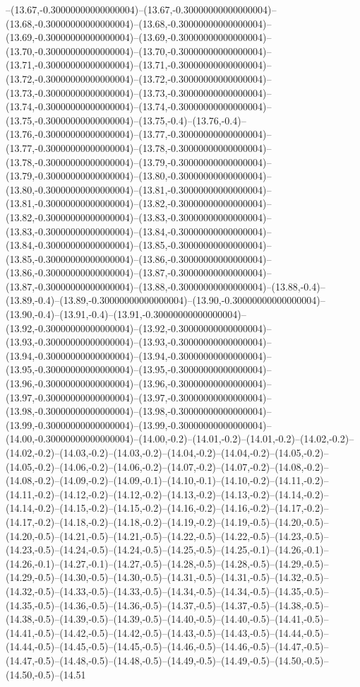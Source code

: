 --(13.67,-0.30000000000000004)--(13.67,-0.30000000000000004)--(13.68,-0.30000000000000004)--(13.68,-0.30000000000000004)--(13.69,-0.30000000000000004)--(13.69,-0.30000000000000004)--(13.70,-0.30000000000000004)--(13.70,-0.30000000000000004)--(13.71,-0.30000000000000004)--(13.71,-0.30000000000000004)--(13.72,-0.30000000000000004)--(13.72,-0.30000000000000004)--(13.73,-0.30000000000000004)--(13.73,-0.30000000000000004)--(13.74,-0.30000000000000004)--(13.74,-0.30000000000000004)--(13.75,-0.30000000000000004)--(13.75,-0.4)--(13.76,-0.4)--(13.76,-0.30000000000000004)--(13.77,-0.30000000000000004)--(13.77,-0.30000000000000004)--(13.78,-0.30000000000000004)--(13.78,-0.30000000000000004)--(13.79,-0.30000000000000004)--(13.79,-0.30000000000000004)--(13.80,-0.30000000000000004)--(13.80,-0.30000000000000004)--(13.81,-0.30000000000000004)--(13.81,-0.30000000000000004)--(13.82,-0.30000000000000004)--(13.82,-0.30000000000000004)--(13.83,-0.30000000000000004)--(13.83,-0.30000000000000004)--(13.84,-0.30000000000000004)--(13.84,-0.30000000000000004)--(13.85,-0.30000000000000004)--(13.85,-0.30000000000000004)--(13.86,-0.30000000000000004)--(13.86,-0.30000000000000004)--(13.87,-0.30000000000000004)--(13.87,-0.30000000000000004)--(13.88,-0.30000000000000004)--(13.88,-0.4)--(13.89,-0.4)--(13.89,-0.30000000000000004)--(13.90,-0.30000000000000004)--(13.90,-0.4)--(13.91,-0.4)--(13.91,-0.30000000000000004)--(13.92,-0.30000000000000004)--(13.92,-0.30000000000000004)--(13.93,-0.30000000000000004)--(13.93,-0.30000000000000004)--(13.94,-0.30000000000000004)--(13.94,-0.30000000000000004)--(13.95,-0.30000000000000004)--(13.95,-0.30000000000000004)--(13.96,-0.30000000000000004)--(13.96,-0.30000000000000004)--(13.97,-0.30000000000000004)--(13.97,-0.30000000000000004)--(13.98,-0.30000000000000004)--(13.98,-0.30000000000000004)--(13.99,-0.30000000000000004)--(13.99,-0.30000000000000004)--(14.00,-0.30000000000000004)--(14.00,-0.2)--(14.01,-0.2)--(14.01,-0.2)--(14.02,-0.2)--(14.02,-0.2)--(14.03,-0.2)--(14.03,-0.2)--(14.04,-0.2)--(14.04,-0.2)--(14.05,-0.2)--(14.05,-0.2)--(14.06,-0.2)--(14.06,-0.2)--(14.07,-0.2)--(14.07,-0.2)--(14.08,-0.2)--(14.08,-0.2)--(14.09,-0.2)--(14.09,-0.1)--(14.10,-0.1)--(14.10,-0.2)--(14.11,-0.2)--(14.11,-0.2)--(14.12,-0.2)--(14.12,-0.2)--(14.13,-0.2)--(14.13,-0.2)--(14.14,-0.2)--(14.14,-0.2)--(14.15,-0.2)--(14.15,-0.2)--(14.16,-0.2)--(14.16,-0.2)--(14.17,-0.2)--(14.17,-0.2)--(14.18,-0.2)--(14.18,-0.2)--(14.19,-0.2)--(14.19,-0.5)--(14.20,-0.5)--(14.20,-0.5)--(14.21,-0.5)--(14.21,-0.5)--(14.22,-0.5)--(14.22,-0.5)--(14.23,-0.5)--(14.23,-0.5)--(14.24,-0.5)--(14.24,-0.5)--(14.25,-0.5)--(14.25,-0.1)--(14.26,-0.1)--(14.26,-0.1)--(14.27,-0.1)--(14.27,-0.5)--(14.28,-0.5)--(14.28,-0.5)--(14.29,-0.5)--(14.29,-0.5)--(14.30,-0.5)--(14.30,-0.5)--(14.31,-0.5)--(14.31,-0.5)--(14.32,-0.5)--(14.32,-0.5)--(14.33,-0.5)--(14.33,-0.5)--(14.34,-0.5)--(14.34,-0.5)--(14.35,-0.5)--(14.35,-0.5)--(14.36,-0.5)--(14.36,-0.5)--(14.37,-0.5)--(14.37,-0.5)--(14.38,-0.5)--(14.38,-0.5)--(14.39,-0.5)--(14.39,-0.5)--(14.40,-0.5)--(14.40,-0.5)--(14.41,-0.5)--(14.41,-0.5)--(14.42,-0.5)--(14.42,-0.5)--(14.43,-0.5)--(14.43,-0.5)--(14.44,-0.5)--(14.44,-0.5)--(14.45,-0.5)--(14.45,-0.5)--(14.46,-0.5)--(14.46,-0.5)--(14.47,-0.5)--(14.47,-0.5)--(14.48,-0.5)--(14.48,-0.5)--(14.49,-0.5)--(14.49,-0.5)--(14.50,-0.5)--(14.50,-0.5)--(14.51